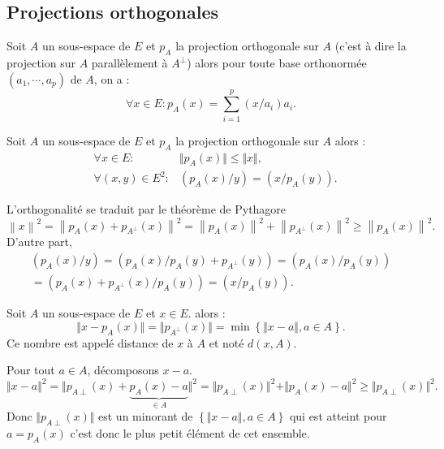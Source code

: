 \subsection{Projections orthogonales}
\begin{prop}
 Soit $A$ un sous-espace de $E$ et $p_A$ la projection orthogonale sur $A$ (c'est à dire la projection sur $A$ parallèlement à $A^\bot$) alors pour toute base orthonormée $(a_1,\cdots,a_p)$ de $A$, on a :
\begin{displaymath}
 \forall x\in E : p_A(x)=\sum_{i=1}^p(x/a_i)a_i .
\end{displaymath}
\end{prop}
\begin{prop}
 Soit $A$ un sous-espace de $E$ et $p_A$ la projection orthogonale sur $A$ alors :
\begin{displaymath}
 \begin{aligned}
  &\forall x \in E :& \Vert p_A(x) \Vert \leq \Vert x \Vert, \\
  &\forall (x,y) \in E^2 :& (p_A(x)/y) = (x/p_A(y)).
 \end{aligned}
\end{displaymath}
\end{prop}
\begin{demo}
 L'orthogonalité se traduit par le théorème de Pythagore
 \begin{displaymath}
\left\|x \right\|^2 = \left\| p_A(x) + p_{A^\perp}(x) \right\|^2 =
\left\| p_A(x) \right\|^2 + \left\| p_{A^\perp}(x) \right\|^2
\geq \left\| p_A(x) \right\|^2 .
 \end{displaymath}
D'autre part,
\begin{multline*}
(p_A(x)/y) = (p_A(x)/p_A(y) + p_{A^\perp}(y)) = (p_A(x)/p_A(y))\\
= (p_A(x)+p_{A^\perp}(x)/p_A(y)) = (x/p_A(y)) .
\end{multline*}
\end{demo}
\newpage
{}
\begin{prop}
 Soit $A$ un sous-espace de $E$ et $x\in E$. alors :
\begin{displaymath}
 \Vert x - p_A(x)\Vert = \Vert p_{A^\bot}(x)\Vert
=\min\left\lbrace \Vert x-a\Vert, a\in A\right\rbrace .
\end{displaymath}
Ce nombre est appelé distance de $x$ à $A$ et noté $d(x,A)$.
\end{prop}
\begin{demo}
Pour tout $a\in A$, décomposons $x-a$.
\begin{displaymath}
\Vert x - a\Vert^2=\Vert p_{A\perp}(x) + \underset{\in A}{\underbrace{p_A(x) -a}}\Vert^2  
= \Vert p_{A\perp}(x) \Vert^2 + \Vert p_A(x) -a\Vert^2 \geq \Vert p_{A\perp}(x) \Vert^2 .
\end{displaymath}
Donc $\Vert p_{A\perp}(x) \Vert$ est un minorant de $\left\lbrace \Vert x-a\Vert, a\in A\right\rbrace$ qui est atteint pour $a=p_A(x)$ c'est donc le plus petit élément de cet ensemble.
\end{demo}
